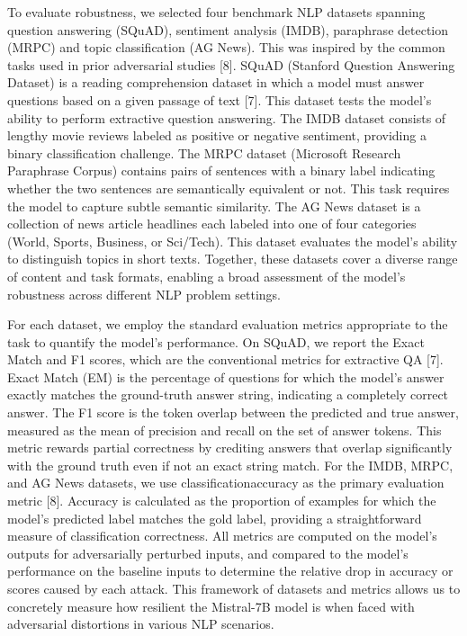 \documentclass[conference]{IEEEtran}
\begin{document}
To evaluate robustness, we selected four benchmark NLP datasets spanning question answering (SQuAD), sentiment analysis (IMDB), paraphrase detection (MRPC) and topic classification (AG News). This was inspired by the common tasks used in prior adversarial studies [8]. SQuAD (Stanford Question Answering Dataset) is a reading comprehension dataset in which a model must answer questions based on a given passage of text [7]. This dataset tests the model’s ability to perform extractive question answering. The IMDB dataset consists of lengthy movie reviews labeled as positive or negative sentiment, providing a binary classification challenge. The MRPC dataset (Microsoft Research Paraphrase Corpus) contains pairs of sentences with a binary label indicating whether the two sentences are semantically equivalent or not. This task requires the model to capture subtle semantic similarity. The AG News dataset is a collection of news article headlines each labeled into one of four categories (World, Sports, Business, or Sci/Tech). This dataset evaluates the model’s ability to distinguish topics in short texts. Together, these datasets cover a diverse range of content and task formats, enabling a broad assessment of the model’s robustness across different NLP problem settings.

For each dataset, we employ the standard evaluation metrics appropriate to the task to quantify the model’s performance. On SQuAD, we report the Exact Match and F1 scores, which are the conventional metrics for extractive QA [7]. Exact Match (EM) is the percentage of questions for which the model’s answer exactly matches the ground-truth answer string, indicating a completely correct answer. The F1 score is the token overlap between the predicted and true answer, measured as the mean of precision and recall on the set of answer tokens. This metric rewards partial correctness by crediting answers that overlap significantly with the ground truth even if not an exact string match. For the IMDB, MRPC, and AG News datasets, we use classificationaccuracy as the primary evaluation metric [8]. Accuracy is calculated as the proportion of examples for which the model’s predicted label matches the gold label, providing a straightforward measure of classification correctness. All metrics are computed on the model’s outputs for adversarially perturbed inputs, and compared to the model’s performance on the baseline inputs to determine the relative drop in accuracy or scores caused by each attack. This framework of datasets and metrics allows us to concretely measure how resilient the Mistral-7B model is when faced with adversarial distortions in various NLP scenarios.
\end{document}
